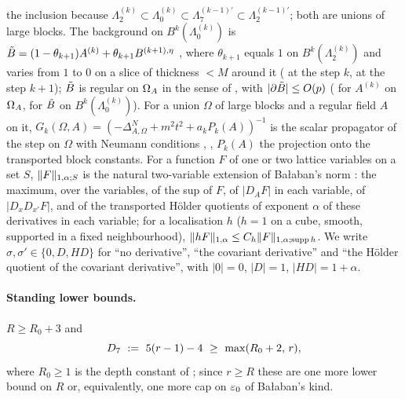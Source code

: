 the inclusion because $\Lambda^{(k)}_2\subset\Lambda^{(k)}_0\subset\Lambda^{(k-1)\prime}_7\subset\Lambda^{(k-1)\prime}_2$; both are unions of large blocks. The background on $B^k(\Lambda^{(k)}_0)$ is $\tilde B=(1-\theta_{k+1})A^{(k)}+\theta_{k+1}B^{(k+1),\eta}$ \cite[p.~579]{Ba2}, where $\theta_{k+1}$ equals $1$ on $B^k(\Lambda^{(k)}_2)$ and varies from $1$ to $0$ on a slice of thickness $<M$ around it (\cite[p.~567]{Ba2} at the step $k$, \cite[(2.96)]{Ba2} at the step $k+1$); $\tilde B$ is regular on $\Omega_{A}$ in the sense of \cite[(2.23)]{Ba1}, with $|\partial\tilde B|\le O(p)$ (\cite[(2.60)]{Ba2} for $A^{(k)}$ on $\Omega_{A}$, \cite[(2.94)--(2.98)]{Ba2} for $\tilde B$ on $B^k(\Lambda^{(k)}_0)$). For a union $\Omega$ of large blocks and a regular field $A$ on it, $G_k(\Omega,A)=(-\Delta^{N}_{A,\Omega}+m^2t^2+a_kP_k(A))^{-1}$ is the scalar propagator of the step on $\Omega$ with Neumann conditions \cite[(2.22)]{Ba1}, \cite[(1.3)]{Ba4}, $P_k(A)$ the projection onto the transported block constants. For a function $F$ of one or two lattice variables on a set $S$, $\lVert F\rVert_{1,\alpha;S}$ is the natural two-variable extension of Ba{\l}aban's norm \cite[(1.32), p.~420]{Ba3}: the maximum, over the variables, of the sup of $F$, of $|D_AF|$ in each variable, of $|D_xD_{x'}F|$, and of the transported H\"older quotients of exponent $\alpha$ of these derivatives in each variable; for a localisation $h$ ($h=1$ on a cube, smooth, supported in a fixed neighbourhood), $\lVert hF\rVert_{1,\alpha}\le C_h\lVert F\rVert_{1,\alpha;\operatorname{supp} h}$. We write $\sigma,\sigma'\in\{0,D,HD\}$ for ``no derivative'', ``the covariant derivative'' and ``the H\"older quotient of the covariant derivative'', with $|0|=0$, $|D|=1$, $|HD|=1+\alpha$.

\paragraph{Standing lower bounds.} $R\ge R_0+3$ and
\begin{equation}\label{eq:a07:D7}
D_7\ :=\ 5(r-1)-4\ \ge\ \max(R_0+2,\,r),
\end{equation}
where $R_0\ge1$ is the depth constant of \cite[Prop.~2.1]{Ba1}; since $r\ge R$ these are one more lower bound on $R$ or, equivalently, one more cap on $\varepsilon_0$ of Ba{\l}aban's kind.

